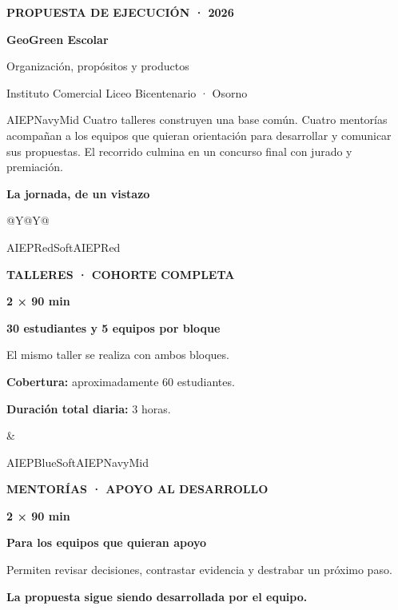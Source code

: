 \documentclass[10pt,a4paper]{article}
\newcommand{\metric}[2]{%
  {\fontsize{23}{25}\selectfont\bfseries\color{#1}#2\par}%
}
\begin{document}
\fontsize{10.4}{13.2}\selectfont

\begin{hero}
{\small\bfseries\color{white!75}\MakeUppercase{Propuesta de ejecución · 2026}\par}
\vspace{3mm}
{\fontsize{27}{31}\selectfont\bfseries\color{white}GeoGreen Escolar\par}
\vspace{1mm}
{\Large\color{white!84}Organización, propósitos y productos\par}
\vspace{4mm}
{\small\color{white!70}Instituto Comercial Liceo Bicentenario · Osorno\par}
\end{hero}

\begin{callout}{AIEPNavyMid}
Cuatro talleres construyen una base común. Cuatro mentorías acompañan a los
equipos que quieran orientación para desarrollar y comunicar sus propuestas.
El recorrido culmina en un concurso final con jurado y premiación.
\end{callout}

\vspace{5mm}
{\Large\bfseries\color{AIEPNavy}La jornada, de un vistazo\par}
\vspace{2.5mm}
\begin{tabularx}{\textwidth}{@{}Y@{\hspace{3.5mm}}Y@{}}
\begin{modebox}[height=48mm]{AIEPRedSoft}{AIEPRed}
{\scriptsize\bfseries\color{AIEPMuted}TALLERES · COHORTE COMPLETA\par}
\vspace{2mm}
\metric{AIEPRed}{2 × 90 min}
\textbf{30 estudiantes y 5 equipos por bloque}\par
\vspace{2mm}
El mismo taller se realiza con ambos bloques.\par
\textbf{Cobertura:} aproximadamente 60 estudiantes.\par
\textbf{Duración total diaria:} 3 horas.
\end{modebox}
&
\begin{modebox}[height=48mm]{AIEPBlueSoft}{AIEPNavyMid}
{\scriptsize\bfseries\color{AIEPMuted}MENTORÍAS · APOYO AL DESARROLLO\par}
\vspace{2mm}
\metric{AIEPNavy}{2 × 90 min}
\textbf{Para los equipos que quieran apoyo}\par
\vspace{2mm}
Permiten revisar decisiones, contrastar evidencia y destrabar un próximo paso.\par
\textbf{La propuesta sigue siendo desarrollada por el equipo.}
\end{modebox}
\end{tabularx}
\end{document}
